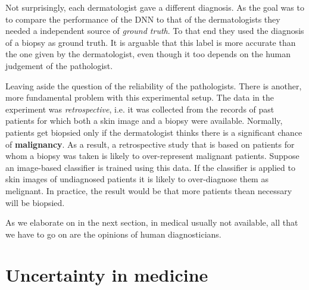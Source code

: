 \documentclass[11pt]{pnas-new}
\begin{document}
  
Not surprisingly, each dermatologist gave a different diagnosis.  As
the goal was to to compare the performance of the DNN to that of the
dermatologists they needed a independent source of {\em ground truth}.
To that end they used the diagnosis of a biopsy as ground truth. It is
arguable that this label is more accurate than the one given by the
dermatologist, even though it too depends on the human judgement of the
pathologist.

Leaving aside the question of the reliability of the
pathologists. There is another, more fundamental problem with this
experimental setup. The data in the experiment was {\em
  retrospective}, i.e. it was collected from the records of past
patients for which both a skin image and a biopsy were
available. Normally, patients get biopsied only if the dermatologist
thinks there is a significant chance of {\bf malignancy}. As a result,
a retrospective study that is based on patients for whom a biopsy was
taken is likely to over-represent malignant patients. Suppose an
image-based classifier is trained using this data. If the classifier
is applied to skin images of undiagnosed patients it is likely to
over-diagnose them as melignant. In practice, the result would be that
more patients thean necessary will be biopsied.


As we elaborate on in the next section, in medical 
usually not available, all that we have to go on are the
opinions of human diagnosticians.

\section{Uncertainty in medicine}

\end{document}
